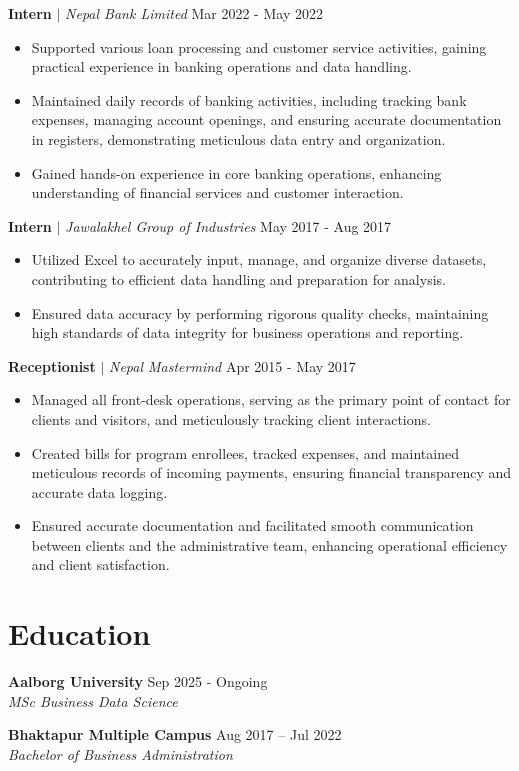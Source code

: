 \documentclass[10pt, letterpaper]{article}
\begin{document}
\vspace{4pt}
\noindent\textbf{Intern} $|$ \textit{Nepal Bank Limited} \hfill Mar 2022 - May 2022
\begin{itemize}[leftmargin=0.15in, topsep=0pt, partopsep=0pt, itemsep=-2pt]
    \item Supported various loan processing and customer service activities, gaining practical experience in banking operations and data handling.
    \item Maintained daily records of banking activities, including tracking bank expenses, managing account openings, and ensuring accurate documentation in registers, demonstrating meticulous data entry and organization.
    \item Gained hands-on experience in core banking operations, enhancing understanding of financial services and customer interaction.
\end{itemize}
\vspace{4pt}
\noindent\textbf{Intern} $|$ \textit{Jawalakhel Group of Industries} \hfill May 2017 - Aug 2017
\begin{itemize}[leftmargin=0.15in, topsep=0pt, partopsep=0pt, itemsep=-2pt]
    \item Utilized Excel to accurately input, manage, and organize diverse datasets, contributing to efficient data handling and preparation for analysis.
    \item Ensured data accuracy by performing rigorous quality checks, maintaining high standards of data integrity for business operations and reporting.
\end{itemize}
\vspace{4pt}
\noindent\textbf{Receptionist} $|$ \textit{Nepal Mastermind} \hfill Apr 2015 - May 2017
\begin{itemize}[leftmargin=0.15in, topsep=0pt, partopsep=0pt, itemsep=-2pt]
    \item Managed all front-desk operations, serving as the primary point of contact for clients and visitors, and meticulously tracking client interactions.
    \item Created bills for program enrollees, tracked expenses, and maintained meticulous records of incoming payments, ensuring financial transparency and accurate data logging.
    \item Ensured accurate documentation and facilitated smooth communication between clients and the administrative team, enhancing operational efficiency and client satisfaction.
\end{itemize}
\vspace{4pt}


\section{Education}
\noindent\textbf{Aalborg University} \hfill Sep 2025 - Ongoing\\
\textit{MSc Business Data Science}\\
\vspace{2pt}

\noindent\textbf{Bhaktapur Multiple Campus} \hfill Aug 2017 – Jul 2022\\
\textit{Bachelor of Business Administration}\\
\vspace{2pt}
\end{document}
